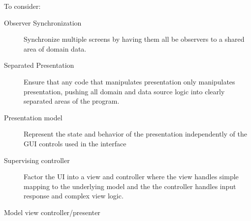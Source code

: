 To consider:
\begin{description}
\item [Observer Synchronization] Synchronize multiple screens by having them all be observers to a shared area of domain data.
\item [Separated Presentation] Ensure that any code that manipulates presentation only manipulates presentation, pushing all domain and data source logic into clearly separated areas of the program.

\item [Presentation model] Represent the state and behavior of the presentation independently of the GUI controls used in the interface

\item [Supervising controller] Factor the UI into a view and controller where the view handles simple mapping to the underlying model and the the controller handles input response and complex view logic.

\item [Model view controller/presenter] 

\end{description}




